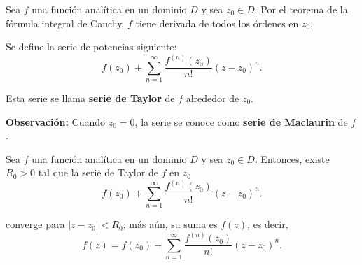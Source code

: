 Sea $f$ una función analítica en un dominio $D$ y sea $z_0 \in D$. Por el teorema de la fórmula integral de Cauchy, $f$ tiene derivada de todos los órdenes en $z_0$.

\begin{defi}
Se define la serie de potencias siguiente:
$$f(z_0) + \sum_{n=1}^{\infty} \frac{f^{(n)}(z_0)}{n!}(z-z_0)^n.$$

Esta serie se llama \textbf{serie de Taylor} de $f$ alrededor de $z_0$.
\end{defi}

\textbf{Observación:} Cuando $z_0 = 0$, la serie se conoce como \textbf{serie de Maclaurin} de $f$.

\begin{teorema}[de Taylor]
Sea $f$ una función analítica en un dominio $D$ y sea $z_0 \in D$. Entonces, existe $R_0 > 0$ tal que la serie de Taylor de $f$ en $z_0$
$$f(z_0) + \sum_{n=1}^{\infty} \frac{f^{(n)}(z_0)}{n!}(z-z_0)^n.$$

converge para $|z-z_0| < R_0$; más aún, su suma es $f(z)$, es decir,
$$f(z) = f(z_0) + \sum_{n=1}^{\infty} \frac{f^{(n)}(z_0)}{n!}(z-z_0)^n.$$
\end{teorema}

